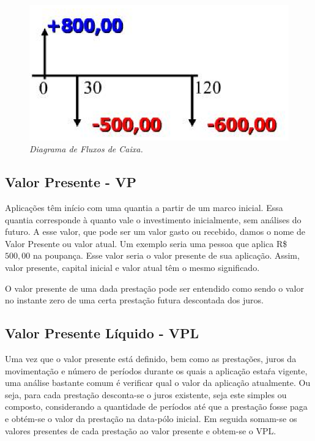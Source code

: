 \begin{figure}[!h]
 \centering
 \includegraphics[scale=0.8]{fluxo.eps}
 \caption{\it Diagrama de Fluxos de Caixa.} \label{fluxo}
\end{figure}

\subsection{Valor Presente - VP}

Aplicações têm início com uma quantia a partir de um marco inicial. Essa quantia corres\-ponde à quanto vale o investimento inicialmente, sem análises do futuro. A esse valor, que pode ser um valor gasto ou recebido, damos o nome de Valor Presente ou valor atual. Um exemplo seria uma pessoa que aplica R\$ $500,00$ na poupança. Esse valor seria o valor presente de sua aplicação. Assim, valor presente, capital inicial e valor atual têm o mesmo significado.

O valor presente de uma dada prestação pode ser entendido como sendo o valor no ins\-tante zero de uma certa prestação futura descontada dos juros.

\subsection{Valor Presente Líquido - VPL}

Uma vez que o valor presente está definido, bem como as prestações, juros da movimentação e número de períodos durante os quais a aplicação estaŕa vigente, uma análise bastante comum é verificar qual o valor da aplicação atualmente. Ou seja, para cada prestação desconta-se o juros existente, seja este simples ou composto, considerando a quantidade de períodos até que a prestação fosse paga e obtém-se o valor da prestação na data-pólo inicial. Em seguida somam-se os valores presentes de cada prestação ao valor presente e obtem-se o VPL.


